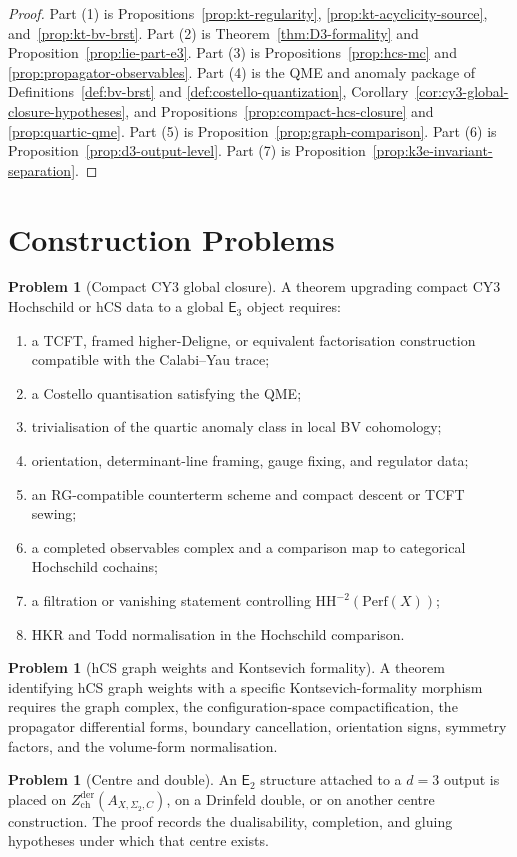 \documentclass[11pt]{amsart}
\theoremstyle{definition}
\newtheorem{problem}[theorem]{Problem}
\theoremstyle{remark}
\providecommand{\Etwo}{\mathsf{E}_2}
\providecommand{\Ethree}{\mathsf{E}_3}
\providecommand{\HH}{\mathrm{HH}}
\providecommand{\Perf}{\mathrm{Perf}}
\begin{document}
\begin{proof}
Part (1) is Propositions~\ref{prop:kt-regularity},
\ref{prop:kt-acyclicity-source}, and~\ref{prop:kt-bv-brst}. Part (2) is
Theorem~\ref{thm:D3-formality} and Proposition~\ref{prop:lie-part-e3}.
Part (3) is Propositions~\ref{prop:hcs-mc} and
\ref{prop:propagator-observables}. Part (4) is the QME and anomaly
package of Definitions~\ref{def:bv-brst} and
\ref{def:costello-quantization}, Corollary~\ref{cor:cy3-global-closure-hypotheses},
and Propositions~\ref{prop:compact-hcs-closure} and
\ref{prop:quartic-qme}. Part (5) is
Proposition~\ref{prop:graph-comparison}. Part (6) is
Proposition~\ref{prop:d3-output-level}. Part (7) is
Proposition~\ref{prop:k3e-invariant-separation}.
\end{proof}

\section{Construction Problems}
\label{sec:construction-problems}

\begin{problem}[Compact CY3 global closure]
\label{obl:compact-cy3-global}
A theorem upgrading compact CY3 Hochschild or hCS data to a global
$\Ethree$ object requires:
\begin{enumerate}
\item a TCFT, framed higher-Deligne, or equivalent factorisation
construction compatible with the Calabi--Yau trace;
\item a Costello quantisation satisfying the QME;
\item trivialisation of the quartic anomaly class in local BV cohomology;
\item orientation, determinant-line framing, gauge fixing, and regulator
data;
\item an RG-compatible counterterm scheme and compact descent or TCFT
sewing;
\item a completed observables complex and a comparison map to
categorical Hochschild cochains;
\item a filtration or vanishing statement controlling
$\HH^{-2}(\Perf(X))$;
\item HKR and Todd normalisation in the Hochschild comparison.
\end{enumerate}
\end{problem}

\begin{problem}[hCS graph weights and Kontsevich formality]
\label{obl:hcs-graphs}
A theorem identifying hCS graph weights with a specific
Kontsevich-formality morphism requires the graph complex, the
configuration-space compactification, the propagator differential forms,
boundary cancellation, orientation signs, symmetry factors, and the
volume-form normalisation.
\end{problem}

\begin{problem}[Centre and double]
\label{obl:center-double}
An $\Etwo$ structure attached to a $d=3$ output is placed on
$Z^{\mathrm{der}}_{\mathrm{ch}}(A_{X,\Sigma_2,C})$, on a Drinfeld
double, or on another centre construction. The proof records the
dualisability, completion, and gluing hypotheses under which that centre
exists.
\end{problem}
\end{document}
